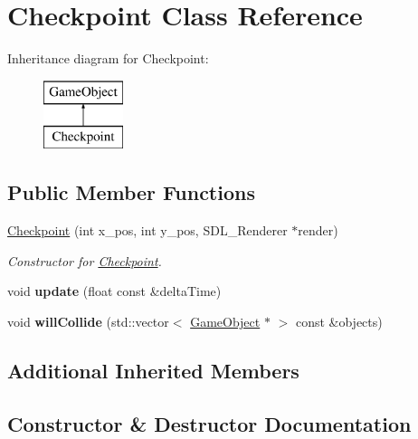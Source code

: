 \hypertarget{class_checkpoint}{}\section{Checkpoint Class Reference}
\label{class_checkpoint}
Inheritance diagram for Checkpoint\+:\begin{figure}[H]
\begin{center}
\leavevmode
\includegraphics[height=2.000000cm]{class_checkpoint}
\end{center}
\end{figure}
\subsection*{Public Member Functions}
\begin{DoxyCompactItemize}
\item 
\hyperlink{class_checkpoint_ab5d42e643ba9db74db101152f0dd8885}{Checkpoint} (int x\+\_\+pos, int y\+\_\+pos, S\+D\+L\+\_\+\+Renderer $\ast$render)
\begin{DoxyCompactList}\small\item\em Constructor for \hyperlink{class_checkpoint}{Checkpoint}. \end{DoxyCompactList}\item 
\hypertarget{class_checkpoint_a7d23d012337203b8d36a92b53083b4fe}{}void {\bfseries update} (float const \&delta\+Time)\label{class_checkpoint_a7d23d012337203b8d36a92b53083b4fe}

\item 
\hypertarget{class_checkpoint_aea1ef559144b096ea6961012986b2a45}{}void {\bfseries will\+Collide} (std\+::vector$<$ \hyperlink{class_game_object}{Game\+Object} $\ast$ $>$ const \&objects)\label{class_checkpoint_aea1ef559144b096ea6961012986b2a45}

\end{DoxyCompactItemize}
\subsection*{Additional Inherited Members}


\subsection{Constructor \& Destructor Documentation}
\hypertarget{class_checkpoint_ab5d42e643ba9db74db101152f0dd8885}{}
